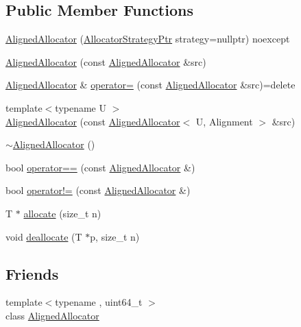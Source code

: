 \subsection*{Public Member Functions}
\begin{DoxyCompactItemize}
\item 
\hyperlink{classhetest_1_1utils_1_1AlignedAllocator_af66cd2d6a02b27e18ba02ffc3a345544}{Aligned\-Allocator} (\hyperlink{namespacehetest_1_1utils_a3f7f347b9f62a88014bdcc45f7987846}{Allocator\-Strategy\-Ptr} strategy=nullptr) noexcept
\item 
\hyperlink{classhetest_1_1utils_1_1AlignedAllocator_a71bdbfb1ae4ac672c4a0dc4e7504e195}{Aligned\-Allocator} (const \hyperlink{classhetest_1_1utils_1_1AlignedAllocator}{Aligned\-Allocator} \&src)
\item 
\hyperlink{classhetest_1_1utils_1_1AlignedAllocator}{Aligned\-Allocator} \& \hyperlink{classhetest_1_1utils_1_1AlignedAllocator_aa4cc09aaeb73f1a43878c740c616dc67}{operator=} (const \hyperlink{classhetest_1_1utils_1_1AlignedAllocator}{Aligned\-Allocator} \&src)=delete
\item 
{\footnotesize template$<$typename U $>$ }\\\hyperlink{classhetest_1_1utils_1_1AlignedAllocator_a3a1080fe5c9e4be3d73da338835c9fa7}{Aligned\-Allocator} (const \hyperlink{classhetest_1_1utils_1_1AlignedAllocator}{Aligned\-Allocator}$<$ U, Alignment $>$ \&src)
\item 
\hyperlink{classhetest_1_1utils_1_1AlignedAllocator_a0d84644228d98daf2407ff6046ceca5a}{$\sim$\-Aligned\-Allocator} ()
\item 
bool \hyperlink{classhetest_1_1utils_1_1AlignedAllocator_a9e7374df3ec465f1b2e522f5e7c57ee0}{operator==} (const \hyperlink{classhetest_1_1utils_1_1AlignedAllocator}{Aligned\-Allocator} \&)
\item 
bool \hyperlink{classhetest_1_1utils_1_1AlignedAllocator_ab17ae365e2e63a0b1c27c5b194b0dbf1}{operator!=} (const \hyperlink{classhetest_1_1utils_1_1AlignedAllocator}{Aligned\-Allocator} \&)
\item 
T $\ast$ \hyperlink{classhetest_1_1utils_1_1AlignedAllocator_a3d9f851ef4ffdbd83936f1810e53752d}{allocate} (size\-\_\-t n)
\item 
void \hyperlink{classhetest_1_1utils_1_1AlignedAllocator_a109a8cc9e6c49b75382f9c019b04ba03}{deallocate} (T $\ast$p, size\-\_\-t n)
\end{DoxyCompactItemize}
\subsection*{Friends}
\begin{DoxyCompactItemize}
\item 
{\footnotesize template$<$typename , uint64\-\_\-t $>$ }\\class \hyperlink{classhetest_1_1utils_1_1AlignedAllocator_aaded07599020ca35e89e078674263c63}{Aligned\-Allocator}
\end{DoxyCompactItemize}



